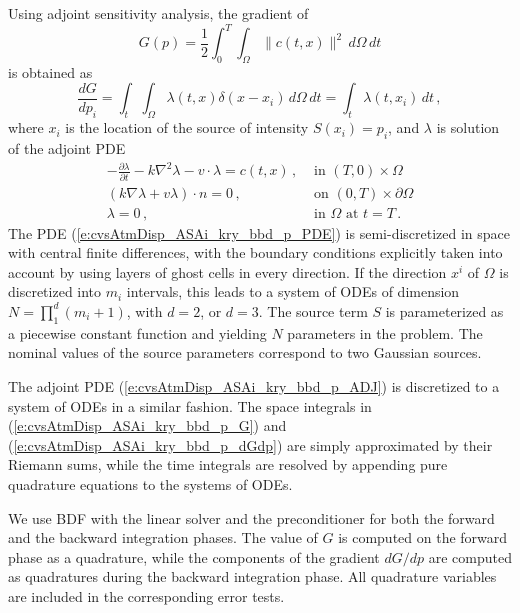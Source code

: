 Using adjoint sensitivity analysis, the gradient of
\begin{equation}\label{e:cvsAtmDisp_ASAi_kry_bbd_p_G}
  G(p) = \frac{1}{2} \int_0^T \int_\Omega \| c(t,x) \|^2 \, d\Omega \, dt
\end{equation}
is obtained as
\begin{equation}\label{e:cvsAtmDisp_ASAi_kry_bbd_p_dGdp}
  \frac{dG}{dp_i} = \int_t \int_\Omega \lambda(t,x) \delta(x-x_i) \, d\Omega \, dt
  = \int_t \lambda(t,x_i) \, dt \, ,
\end{equation}
where $x_i$ is the location of the source of intensity $S(x_i)=p_i$, and $\lambda$
is solution of the adjoint PDE
\begin{equation}\label{e:cvsAtmDisp_ASAi_kry_bbd_p_ADJ}
  \begin{split}
    - \frac{\partial\lambda}{\partial t} - k \nabla^2\lambda - v \cdot \lambda = c(t,x)  \, ,
    &\text{ in } (T,0) \times \Omega \\
    (k \nabla\lambda + v \lambda) \cdot n = 0 \, ,
    &\text{ on } (0,T) \times \partial\Omega \\
    \lambda = 0 \, ,
    &\text{ in } \Omega \text{ at } t = T \, .
  \end{split}
\end{equation}
The PDE (\ref{e:cvsAtmDisp_ASAi_kry_bbd_p_PDE}) is semi-discretized in space with 
central finite differences, with the boundary conditions explicitly taken into account 
by using layers of ghost cells in every direction. If the direction $x^i$ of $\Omega$
is discretized into $m_i$ intervals, this leads to a system of ODEs of dimension 
$N = \prod_1^d (m_i+1)$, with $d=2$, or $d=3$.
The source term $S$ is parameterized as a piecewise constant function and yielding
$N$ parameters in the problem. The nominal values of the source parameters correspond
to two Gaussian sources.

The adjoint PDE (\ref{e:cvsAtmDisp_ASAi_kry_bbd_p_ADJ}) is discretized to a system of
ODEs in a similar fashion.  The space integrals in (\ref{e:cvsAtmDisp_ASAi_kry_bbd_p_G})
and (\ref{e:cvsAtmDisp_ASAi_kry_bbd_p_dGdp}) are simply approximated by their
Riemann sums, while the time integrals are resolved by appending pure quadrature
equations to the systems of ODEs.

We use BDF with the {\cvspgmr} linear solver and the {\cvbbdpre} preconditioner for
both the forward and the backward integration phases. The value of $G$ is computed
on the forward phase as a quadrature, while the components of the gradient $dG/dp$
are computed as quadratures during the backward integration phase.  All quadrature
variables are included in the corresponding error tests.


